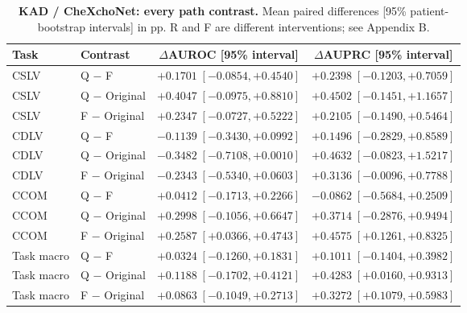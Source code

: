 \begin{table}[tp]
\centering
\caption{\textbf{KAD / CheXchoNet: every path contrast.} Mean paired differences [95\% patient-bootstrap intervals] in pp. R and F are different interventions; see Appendix B.}
\label{tab:supp-cardiac-path-ci-kad}
\small
\setlength{\tabcolsep}{4pt}
\begin{tabular*}{\textwidth}{@{\extracolsep{\fill}}llcc@{}}
\toprule
Task & Contrast & $\Delta$AUROC [95\% interval] & $\Delta$AUPRC [95\% interval] \\
\midrule
CSLV & Q $-$ F & $+0.1701\;[-0.0854,+0.4540]$ & $+0.2398\;[-0.1203,+0.7059]$ \\
CSLV & Q $-$ Original & $+0.4047\;[-0.0975,+0.8810]$ & $+0.4502\;[-0.1451,+1.1657]$ \\
CSLV & F $-$ Original & $+0.2347\;[-0.0727,+0.5222]$ & $+0.2105\;[-0.1490,+0.5464]$ \\
CDLV & Q $-$ F & $-0.1139\;[-0.3430,+0.0992]$ & $+0.1496\;[-0.2829,+0.8589]$ \\
CDLV & Q $-$ Original & $-0.3482\;[-0.7108,+0.0010]$ & $+0.4632\;[-0.0823,+1.5217]$ \\
CDLV & F $-$ Original & $-0.2343\;[-0.5340,+0.0603]$ & $+0.3136\;[-0.0096,+0.7788]$ \\
CCOM & Q $-$ F & $+0.0412\;[-0.1713,+0.2266]$ & $-0.0862\;[-0.5684,+0.2509]$ \\
CCOM & Q $-$ Original & $+0.2998\;[-0.1056,+0.6647]$ & $+0.3714\;[-0.2876,+0.9494]$ \\
CCOM & F $-$ Original & $+0.2587\;[+0.0366,+0.4743]$ & $+0.4575\;[+0.1261,+0.8325]$ \\
Task macro & Q $-$ F & $+0.0324\;[-0.1260,+0.1831]$ & $+0.1011\;[-0.1404,+0.3982]$ \\
Task macro & Q $-$ Original & $+0.1188\;[-0.1702,+0.4121]$ & $+0.4283\;[+0.0160,+0.9313]$ \\
Task macro & F $-$ Original & $+0.0863\;[-0.1049,+0.2713]$ & $+0.3272\;[+0.1079,+0.5983]$ \\
\bottomrule
\end{tabular*}
\end{table}

